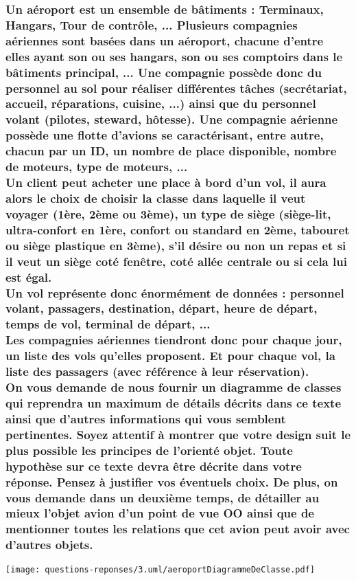 \subsubsection[Fournir un diagramme de classes complet sur un aéroport]{Un aéroport est un ensemble de bâtiments : Terminaux, Hangars, Tour de contrôle, ... Plusieurs compagnies aériennes sont basées dans un aéroport, chacune d'entre elles ayant son ou ses hangars, son ou ses comptoirs dans le bâtiments principal, ... Une compagnie possède donc du personnel au sol pour réaliser différentes tâches (secrétariat, accueil, réparations, cuisine, ...) ainsi que du personnel volant (pilotes, steward, hôtesse). Une compagnie aérienne possède une flotte d'avions se caractérisant, entre autre, chacun par un ID, un nombre de place disponible, nombre de moteurs, type de moteurs, ...
\\Un client peut acheter une place à bord d'un vol, il aura alors le choix de choisir la classe dans laquelle il veut voyager (1ère, 2ème ou 3ème), un type de siège (siège-lit, ultra-confort en 1ère, confort ou standard en 2ème, tabouret ou siège plastique en 3ème), s'il désire ou non un repas et si il veut un siège coté fenêtre, coté allée centrale ou si cela lui est égal.
\\Un vol représente donc énormément de données : personnel volant, passagers, destination, départ, heure de départ, temps de vol, terminal de départ, ...
\\Les compagnies aériennes tiendront donc pour chaque jour, un liste des vols qu'elles proposent. Et pour chaque vol, la liste des passagers (avec référence à leur réservation).
\\On vous demande de nous fournir un diagramme de classes qui reprendra un maximum de détails décrits dans ce texte ainsi que d'autres informations qui vous semblent pertinentes. Soyez attentif à montrer que votre design suit le plus possible les principes de l'orienté objet. Toute hypothèse sur ce texte devra être décrite dans votre réponse. Pensez à justifier vos éventuels choix. De plus, on vous demande dans un deuxième temps, de détailler au mieux l'objet avion d'un point de vue OO ainsi que de mentionner toutes les relations que cet avion peut avoir avec d'autres objets.}
\begin{center}
    \color[rgb]{0,0.48,0.58}
    \texttt{[image: questions-reponses/3.uml/aeroportDiagrammeDeClasse.pdf]}
\end{center}



